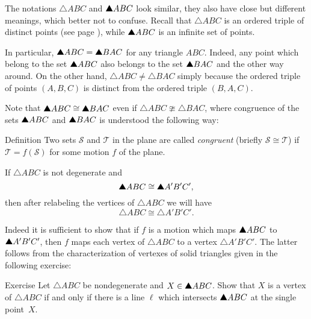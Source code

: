 

The notations $\triangle ABC$ and $\solidtriangle ABC$ look similar,
they also have close but different meanings, 
which better not to confuse.
Recall that $\triangle ABC$ is an ordered triple of distinct points
(see page \pageref{page:def:triangle}),
while $\solidtriangle ABC$ is an infinite set of points.

In particular, $\solidtriangle ABC=\solidtriangle BAC$ for any triangle $ABC$.
Indeed, any point which belong to the set $\solidtriangle ABC$ 
also belongs to the set $\solidtriangle BAC$
and the other way around.
On the other hand,
$\triangle ABC\ne\triangle BAC$ simply because the ordered triple of points $(A,B,C)$ is distinct from the ordered triple $(B,A,C)$.

Note that $\solidtriangle ABC\cong\solidtriangle BAC$ even if $\triangle ABC\ncong\triangle BAC$, where congruence of the sets $\solidtriangle ABC$ and $\solidtriangle BAC$ 
is understood the following way:

\begin{thm}{Definition}\label{def:cong-sets}
Two sets $\mathcal{S}$ and $\mathcal{T}$ in the plane  
are called \emph{congruent} 
(briefly $\mathcal{S}\cong \mathcal{T}$)
if 
$\mathcal{T}=f(\mathcal{S})$ for some motion $f$ of the plane.
\end{thm}

If $\triangle ABC$ is not degenerate
and \[\solidtriangle ABC\cong \solidtriangle A'B'C',\]
then after relabeling the vertices of $\triangle ABC$ 
we will have 
\[\triangle ABC\cong \triangle A'B'C'.\]

Indeed it is sufficient to show that 
if $f$ is a motion which maps $\solidtriangle ABC$ to $\solidtriangle A'B'C'$,
then $f$ maps each vertex of $\triangle ABC$ to a vertex $\triangle A'B'C'$.
The latter follows from the characterization of vertexes of solid triangles given in the following exercise:

\begin{thm}{Exercise}\label{ex:vertex}
Let $\triangle ABC$ be nondegenerate and $X\z\in \solidtriangle ABC$.
Show that $X$ is a vertex of $\triangle ABC$
if and only if there is a line $\ell$ which intersects $\solidtriangle ABC$
at the single point~$X$.
\end{thm}

